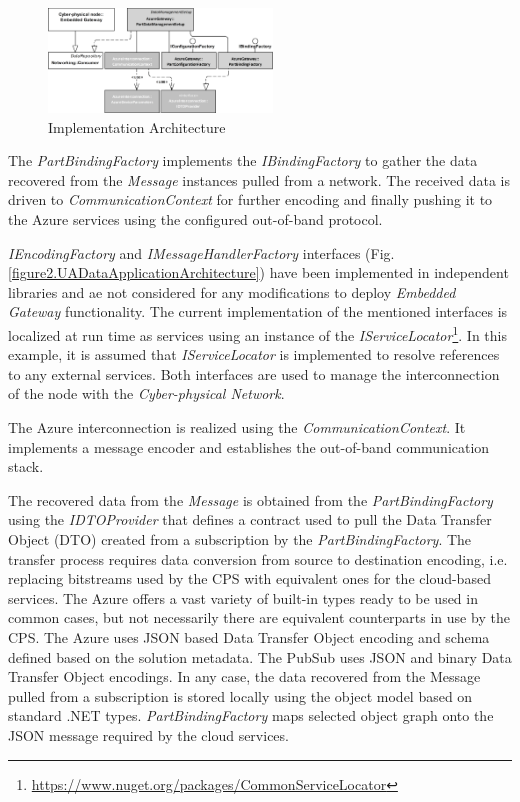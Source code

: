 \documentclass[runningheads]{llncs}
\begin{document}
\begin{figure}
      \centering
      \includegraphics[width=0.53\textwidth]{../../.Media/ImplementationArchitecture.png}
      \caption{Implementation Architecture}\label{figure4.ImplementationArchitecture}
\end{figure}

The \emph{PartBindingFactory} implements the \emph{IBindingFactory} to gather the data recovered from the \emph{Message} instances pulled from a network. The received data is driven to \emph{CommunicationContext} for further encoding and finally pushing it to the Azure services using the configured out-of-band protocol.

\emph{IEncodingFactory} and \emph{IMessageHandlerFactory} interfaces (Fig. \ref{figure2.UADataApplicationArchitecture}) have been implemented in independent libraries and ae not considered for any modifications to deploy \emph{Embedded Gateway} functionality. The current implementation of the mentioned interfaces is localized at run time as services using an instance of the \emph{IServiceLocator}\footnote{ \url{https://www.nuget.org/packages/CommonServiceLocator} }. In this example, it is assumed that \emph{IServiceLocator} is implemented to resolve references to any external services. Both interfaces are used to manage the interconnection of the node with the \emph{Cyber-physical Network}.

The Azure interconnection is realized using the \emph{CommunicationContext}. It implements a message encoder and establishes the out-of-band communication stack.

The recovered data from the \emph{Message} is obtained from the \emph{PartBindingFactory} using the \emph{IDTOProvider} that defines a contract used to pull the Data Transfer Object (DTO) created from a subscription by the \emph{PartBindingFactory}. The transfer process requires data conversion from source to destination encoding, i.e. replacing bitstreams used by the CPS with equivalent ones for the cloud-based services. The Azure offers a vast variety of built-in types ready to be used in common cases, but not necessarily there are equivalent counterparts in use by the CPS. The Azure uses JSON based Data Transfer Object encoding and schema defined based on the solution metadata. The PubSub uses JSON and binary Data Transfer Object encodings. In any case, the data recovered from the Message pulled from a subscription is stored locally using the object model based on standard .NET types. \emph{PartBindingFactory} maps selected object graph onto the JSON message required by the cloud services.
\end{document}
